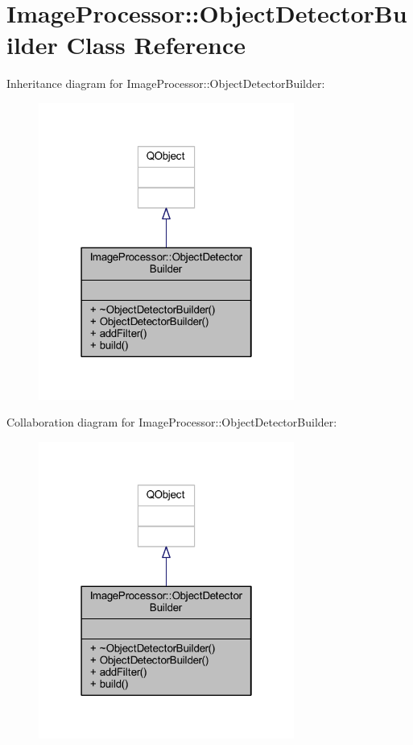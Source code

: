 \hypertarget{class_image_processor_1_1_object_detector_builder}{}\section{Image\+Processor\+:\+:Object\+Detector\+Builder Class Reference}
\label{class_image_processor_1_1_object_detector_builder}


Inheritance diagram for Image\+Processor\+:\+:Object\+Detector\+Builder\+:\nopagebreak
\begin{figure}[H]
\begin{center}
\leavevmode
\includegraphics[width=238pt]{d5/d5e/class_image_processor_1_1_object_detector_builder__inherit__graph}
\end{center}
\end{figure}


Collaboration diagram for Image\+Processor\+:\+:Object\+Detector\+Builder\+:\nopagebreak
\begin{figure}[H]
\begin{center}
\leavevmode
\includegraphics[width=238pt]{db/d22/class_image_processor_1_1_object_detector_builder__coll__graph}
\end{center}
\end{figure}
